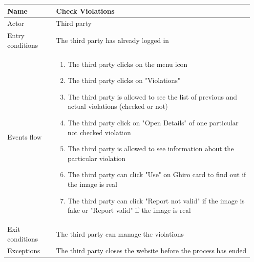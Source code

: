 \documentclass{article}
\begin{document}
\begin{table}[H]
    \begin{tabular}{|l|l|}
    \hline
    Name & \begin{minipage}[t]{0.7\textwidth}\textbf{Check Violations} \end{minipage} \\ \hline  
    Actor & \begin{minipage}[t]{0.7\textwidth} Third party \end{minipage} \\ \hline 
    Entry conditions & \begin{minipage}[t]{0.7\textwidth} The third party has already logged in \end{minipage} \\
    \hline 
    Events flow & \begin{minipage}[t]{0.7\textwidth}
    \begin{enumerate}
        \item The third party clicks on the menu icon
        \item The third party clicks on "Violations"
        \item The third party is allowed to see the list of previous and
        actual violations (checked or not)
        \item The third party click on "Open Details" of one particular not
        checked violation
        \item The third party is allowed to see information about the particular
        violation
        \item The third party can click "Use" on Ghiro card to find out if the
        image is real
        \item The third party can click "Report not valid" if the image is fake
        or "Report valid" if the image is real
    \end{enumerate}
    \end{minipage} \\ \hline
    Exit conditions & \begin{minipage}[t]{0.7\textwidth} The third party can manage the violations \end{minipage} \\
    \hline
    Exceptions & \begin{minipage}[t]{0.7\textwidth}The third party closes the
    website before the process has ended \end{minipage} \\ \hline
    \end{tabular}
\end{table}
\end{document}
